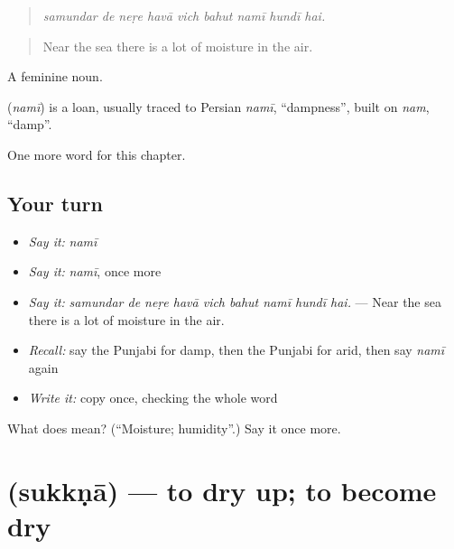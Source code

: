 \begin{quote}
        
\end{quote}

\begin{quote}
\emph{samundar de neṛe havā vich bahut namī hundī hai.}
\end{quote}

\begin{quote}
Near the sea there is a lot of moisture in the air.
\end{quote}

A feminine noun.

\begin{cousinweb}
\textbf{} (\emph{namī}) is a loan, usually traced to Persian \emph{namī}, \textquotedblleft{}dampness\textquotedblright{}, built on \emph{nam}, \textquotedblleft{}damp\textquotedblright{}.
\end{cousinweb}

\begin{grammarlens}[title={What you've built}]
One more word for this chapter.
\end{grammarlens}

\subsection*{Your turn}
\begin{itemize}
\raggedright
  \item \emph{Say it:} \emph{namī}
  \item \emph{Say it:} \emph{namī}, once more
  \item \emph{Say it:} \emph{samundar de neṛe havā vich bahut namī hundī hai.} — Near the sea there is a lot of moisture in the air.
  \item \emph{Recall:} say the Punjabi for damp, then the Punjabi for arid, then say \emph{namī} again
  \item \emph{Write it:} copy \textbf{} once, checking the whole word
\end{itemize}

\begin{tcolorbox}[breakable,colback=teal!4,colframe=teal!35!black,title={Before you move on}]
What does  mean? (\textquotedblleft{}Moisture; humidity\textquotedblright{}.) Say it once more.
\end{tcolorbox}
\section[\texorpdfstring{\pa{ਸੁੱਕਣਾ} (sukkṇā)}{ਸੁੱਕਣਾ (sukkṇā)}]{ (sukkṇā) — to dry up; to become dry}

